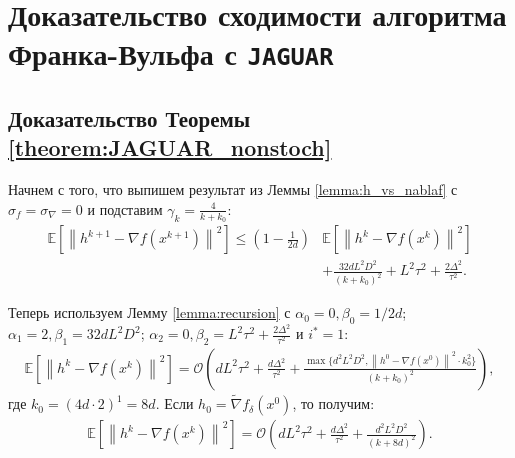 

\section{Доказательство сходимости алгоритма Франка-Вульфа с \texttt{JAGUAR}} \label{appendix:FW}

\subsection{Доказательство Теоремы \ref{theorem:JAGUAR_nonstoch}}
        
    Начнем с того, что выпишем результат из Леммы \ref{lemma:h_vs_nablaf} с $\sigma_f = \sigma_\nabla = 0$ и подставим $\gamma_k = \frac{4}{k + k_0}$:
    \begin{align*}
        \mathbb{E} \left[ \left\| h^{k + 1} - \nabla f(x^{k + 1}) \right\|^2 \right] \leq \left(1 - \frac{1}{2 d} \right)
        & \mathbb{E}
        \left[ \left\| h^k - \nabla f(x^k) \right\|^2 \right] \\
        &+ 
        \frac{32 d L^2 D^2}{(k + k_0)^2} + L^2 \tau^2 + \frac{2 \Delta^2}{\tau^2}.
    \end{align*}
    
    Теперь используем Лемму \ref{lemma:recursion} с $\alpha_0 = 0, \beta_0 = 1/2d$; $\alpha_1 = 2, \beta_1 = 32d L^2 D^2$; $\alpha_2 = 0, \beta_2 = L^2 \tau^2 + \frac{2 \Delta^2}{\tau^2}$ и $i^* = 1$:
    \begin{align*}
        \mathbb{E} \left[ \left\| h^k - \nabla f(x^k) \right\|^2 \right] = \mathcal{O} \left( d L^2 \tau^2 + \frac{d \Delta^2}{\tau^2} + \frac{\max \{d^2 L^2 D^2, \left\| h^0 - \nabla f(x^0) \right\|^2 \cdot k_0^2\}}{(k + k_0)^2} \right),
        \end{align*}
    где $k_0 = (4d \cdot 2)^1 = 8d$. Если $h_0 = \widetilde{\nabla} f_\delta (x^0)$, то получим:
    \begin{align*}
        \mathbb{E} \left[ \left\| h^k - \nabla f(x^k) \right\|^2 \right] = \mathcal{O} \left( d L^2 \tau^2 + \frac{d \Delta^2}{\tau^2} + \frac{d^2 L^2 D^2}{(k + 8d)^2} \right).
    \end{align*}

